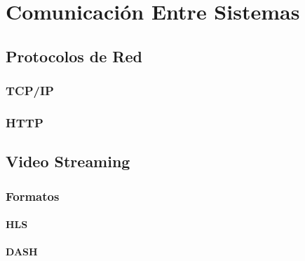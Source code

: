 \chapter{Comunicación Entre Sistemas}

\section{Protocolos de Red}

\subsection{TCP/IP}

\subsection{HTTP}

\section{Video Streaming}

\subsection{Formatos}

\subsubsection{HLS}

\subsubsection{DASH}

